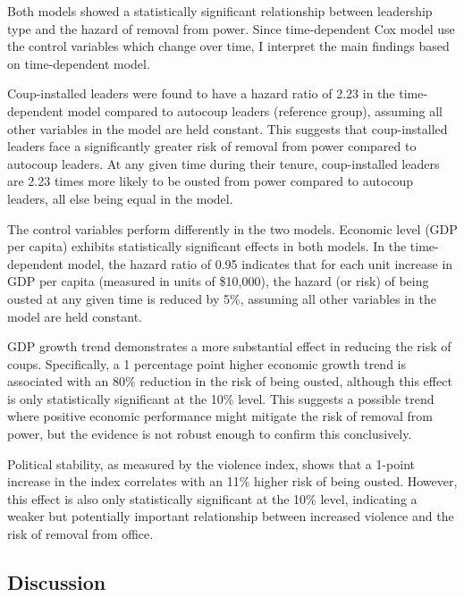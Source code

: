 \documentclass[
  12pt,
]{report}
\begin{document}
Both models showed a statistically significant relationship between
leadership type and the hazard of removal from power. Since
time-dependent Cox model use the control variables which change over
time, I interpret the main findings based on time-dependent model.

Coup-installed leaders were found to have a hazard ratio of 2.23 in the
time-dependent model compared to autocoup leaders (reference group),
assuming all other variables in the model are held constant. This
suggests that coup-installed leaders face a significantly greater risk
of removal from power compared to autocoup leaders. At any given time
during their tenure, coup-installed leaders are 2.23 times more likely
to be ousted from power compared to autocoup leaders, all else being
equal in the model.

The control variables perform differently in the two models. Economic
level (GDP per capita) exhibits statistically significant effects in
both models. In the time-dependent model, the hazard ratio of 0.95
indicates that for each unit increase in GDP per capita (measured in
units of \$10,000), the hazard (or risk) of being ousted at any given
time is reduced by 5\%, assuming all other variables in the model are
held constant.

GDP growth trend demonstrates a more substantial effect in reducing the
risk of coups. Specifically, a 1 percentage point higher economic growth
trend is associated with an 80\% reduction in the risk of being ousted,
although this effect is only statistically significant at the 10\%
level. This suggests a possible trend where positive economic
performance might mitigate the risk of removal from power, but the
evidence is not robust enough to confirm this conclusively.

Political stability, as measured by the violence index, shows that a
1-point increase in the index correlates with an 11\% higher risk of
being ousted. However, this effect is also only statistically
significant at the 10\% level, indicating a weaker but potentially
important relationship between increased violence and the risk of
removal from office.

\subsection{Discussion}\label{discussion}
\end{document}

